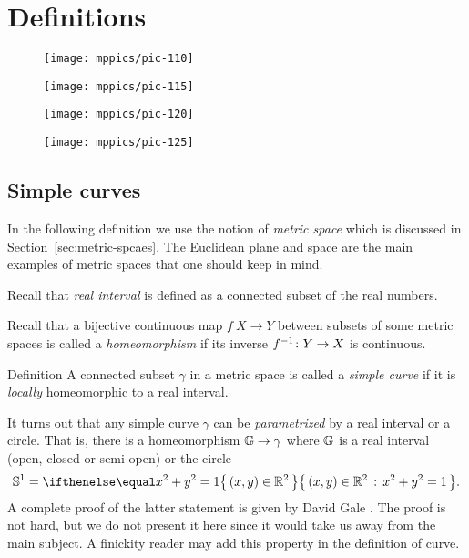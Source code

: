 \chapter{Definitions}


\begin{figure}[h!]
\begin{minipage}{.48\textwidth}
\centering
\texttt{[image: mppics/pic-110]}
\end{minipage}\hfill
\begin{minipage}{.48\textwidth}
\centering
\texttt{[image: mppics/pic-115]}
\end{minipage}
\bigskip
\begin{minipage}{.48\textwidth}
\centering
\texttt{[image: mppics/pic-120]}
\end{minipage}\hfill
\begin{minipage}{.48\textwidth}
\centering
\texttt{[image: mppics/pic-125]}
\end{minipage}
\end{figure}

\section{Simple curves}

In the following definition we use the notion of {}\emph{metric space} which is discussed in Section~\ref{sec:metric-spcaes}.
The Euclidean plane and space are the main examples of metric spaces that one should keep in mind.

Recall that \emph{real interval} is defined as a connected subset of the real numbers.

Recall that a bijective continuous map $f\:X\to Y$ between subsets of some metric spaces is called a {}\emph{homeomorphism} if its inverse $f^{-1}\:Y\z\to X$ is continuous.  

\begin{thm}{Definition} 
A connected subset $\gamma$ in a metric space is called a \emph{simple curve} if it is {}\emph{locally} homeomorphic to a real interval.
\end{thm}

It turns out that any simple curve $\gamma$ can be \emph{parametrized} by a real interval or a circle.
That is, there is a homeomorphism $\mathbb{G}\to\gamma$ 
where $\mathbb{G}$ is a real interval (open, closed or semi-open) or the circle
\[\mathbb{S}^1=\set{(x,y)\in\RR^2}{x^2+y^2=1}.\] 
A complete proof of the latter statement is given by David Gale \cite{gale}.
The proof is not hard, but we do not present it here since it would take us away from the main subject.
A finickity reader may add this property in the definition of curve.

